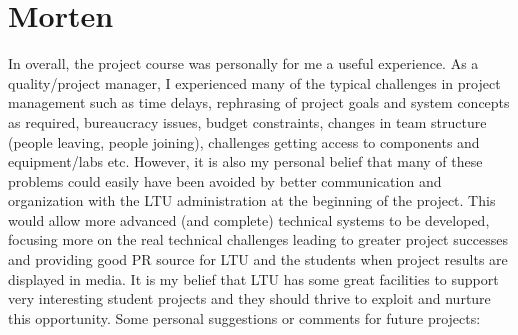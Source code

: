 \section{Morten}
In overall, the project course was personally for me a useful experience. As a quality/project manager, I experienced many of the typical challenges in project management such as time delays, rephrasing of project goals and system concepts as required, bureaucracy issues, budget constraints, changes in team structure (people leaving, people joining), challenges getting access to components and equipment/labs etc. However, it is also my personal belief that many of these problems could easily have been avoided by better communication and organization with the LTU administration at the beginning of the project. This would allow more advanced (and complete) technical systems to be developed, focusing more on the real technical challenges leading to greater project successes and providing good PR source for LTU and the students when project results are displayed in media. It is my belief that LTU has some great facilities to support very interesting student projects and they should thrive to exploit and nurture this opportunity.
%
Some personal suggestions or comments for future projects:
